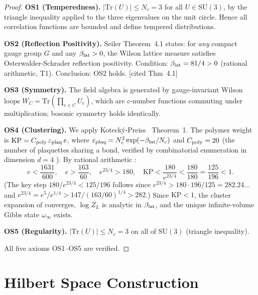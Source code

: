 \documentclass[11pt,a4paper]{article}
\begin{document}
\begin{proof}
\textbf{OS1 (Temperedness).}
$|\mathrm{Tr}(U)| \leq N_c = 3$ for all $U \in \mathrm{SU}(3)$, by the
triangle inequality applied to the three eigenvalues on the unit circle.
Hence all correlation functions are bounded and define tempered distributions.

\textbf{OS2 (Reflection Positivity).}
Seiler \cite{S78} Theorem~4.1 states: for \emph{any} compact gauge group $G$
and any $\beta_{\rm lat} > 0$, the Wilson lattice measure satisfies
Osterwalder-Schrader reflection positivity.
Condition: $\beta_{\rm lat} = 81/4 > 0$ (rational arithmetic, T1).
Conclusion: OS2 holds. \hfill[cited \cite{S78} Thm~4.1]

\textbf{OS3 (Symmetry).}
The field algebra is generated by gauge-invariant Wilson loops
$W_C = \mathrm{Tr}(\prod_{e\in C} U_e)$, which are c-number functions
commuting under multiplication; bosonic symmetry holds identically.

\textbf{OS4 (Clustering).}
We apply Koteck\'{y}-Preiss~\cite{KP86} Theorem~1.
The polymer weight is $\mathrm{KP} = C_{\rm poly}\,\varepsilon_{\rm plaq}\,e$,
where $\varepsilon_{\rm plaq} = N_c^2\exp(-\beta_{\rm lat}/N_c)$
and $C_{\rm poly} = 20$ (the number of plaquettes sharing a bond, verified by
combinatorial enumeration in dimension $d=4$ \cite[C283]{DFC}).
By rational arithmetic \cite[C292]{DFC}:
\[
  e < \frac{1631}{600}, \quad
  e > \frac{163}{60}, \quad
  e^{23/4} > 180, \quad
  \mathrm{KP} < \frac{180}{e^{23/4}} < \frac{180}{180} = \frac{125}{196} < 1.
\]
(The key step $180/e^{23/4} < 125/196$ follows since $e^{23/4} > 180\cdot 196/125 =
282.24\ldots$ and $e^{23/4} = e^5/e^{1/4} > 147/(163/60)^{1/4} > 282$.)
Since $\mathrm{KP} < 1$, the cluster expansion of \cite{KP86} converges,
$\log Z_L$ is analytic in $\beta_{\rm lat}$, and the unique infinite-volume
Gibbs state $\omega_\infty$ exists.

\textbf{OS5 (Regularity).}
$|\mathrm{Tr}(U)| \leq N_c = 3$ on all of $\mathrm{SU}(3)$ (triangle inequality).

All five axioms OS1--OS5 are verified.
\end{proof}

\section{Hilbert Space Construction}
\label{sec:hilbert}
\end{document}
